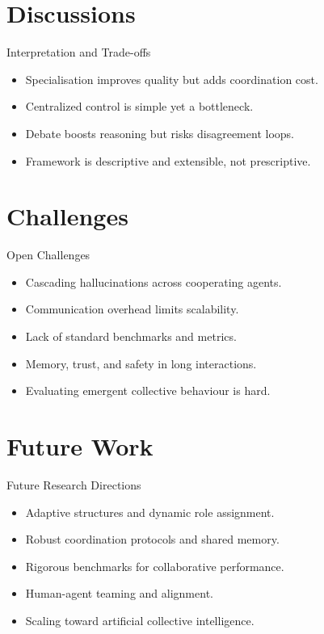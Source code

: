 \documentclass{beamer}
\begin{document}
\section{Discussions}
\begin{frame}{Interpretation and Trade-offs}
\begin{itemize}
  \item Specialisation improves quality but adds coordination cost.
  \item Centralized control is simple yet a bottleneck.
  \item Debate boosts reasoning but risks disagreement loops.
  \item Framework is descriptive and extensible, not prescriptive.
\end{itemize}
\end{frame}

\section{Challenges}
\begin{frame}{Open Challenges}
\begin{itemize}
  \item Cascading hallucinations across cooperating agents.
  \item Communication overhead limits scalability.
  \item Lack of standard benchmarks and metrics.
  \item Memory, trust, and safety in long interactions.
  \item Evaluating emergent collective behaviour is hard.
\end{itemize}
\end{frame}

\section{Future Work}
\begin{frame}{Future Research Directions}
\begin{itemize}
  \item Adaptive structures and dynamic role assignment.
  \item Robust coordination protocols and shared memory.
  \item Rigorous benchmarks for collaborative performance.
  \item Human-agent teaming and alignment.
  \item Scaling toward artificial collective intelligence.
\end{itemize}
\end{frame}
\end{document}
